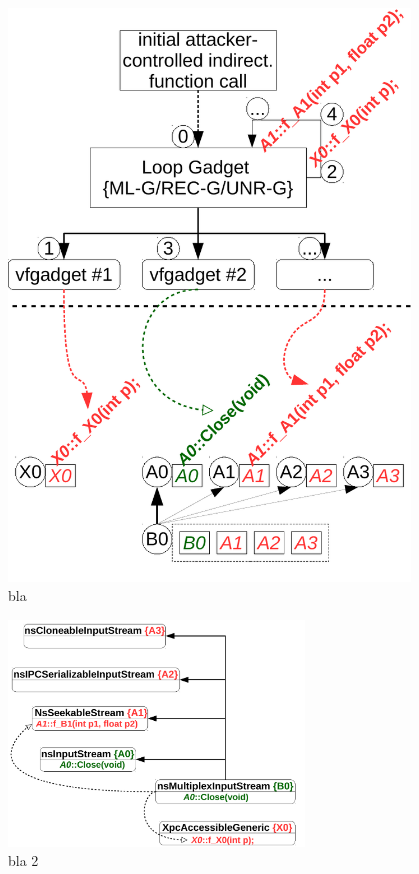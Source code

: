 \begin{figure}
 \begin{minipage}{.48\textwidth}
\usebox{\firstlisting}
\end{minipage}%
\hfill
%
\hspace{2.2cm}
\begin{minipage}{.48\textwidth}
    \includegraphics[width=0.95\textwidth]{figures/loop.pdf}
\end{minipage}
\caption{bla}
\end{figure}

\begin{figure}
    \includegraphics[width=0.7\textwidth]{figures/class_hierarchy.pdf}
\caption{bla 2}
\end{figure}

